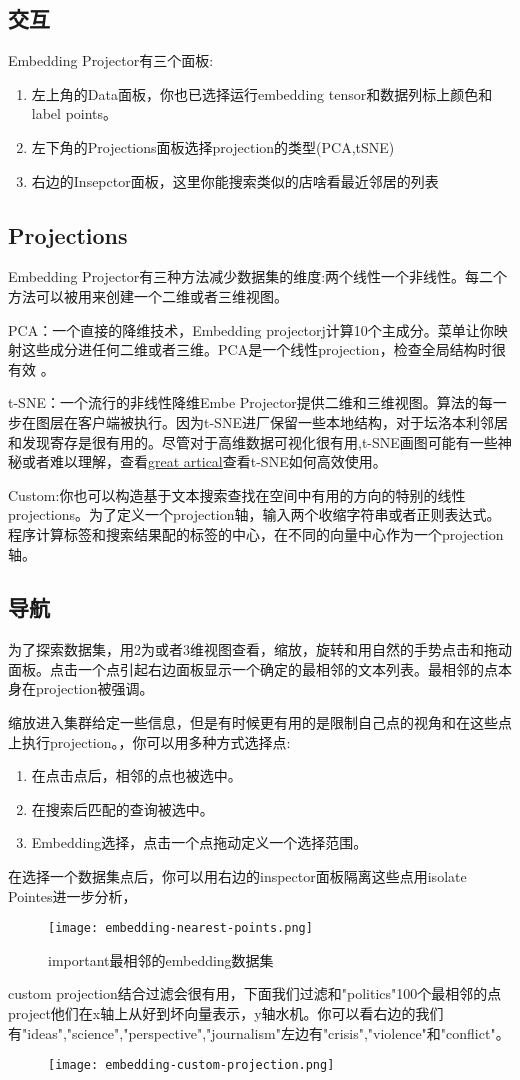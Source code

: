 \subsection{交互}
Embedding Projector有三个面板:
\begin{enumerate}
	\item 左上角的Data面板，你也已选择运行embedding tensor和数据列标上颜色和label points。
	\item 左下角的Projections面板选择projection的类型(PCA,tSNE)
	\item 右边的Insepctor面板，这里你能搜索类似的店啥看最近邻居的列表
\end{enumerate}
\subsection{Projections}
Embedding Projector有三种方法减少数据集的维度:两个线性一个非线性。每二个方法可以被用来创建一个二维或者三维视图。

PCA：一个直接的降维技术，Embedding projectorj计算10个主成分。菜单让你映射这些成分进任何二维或者三维。PCA是一个线性projection，检查全局结构时很有效
。

t-SNE：一个流行的非线性降维Embe Projector提供二维和三维视图。算法的每一步在图层在客户端被执行。因为t-SNE进厂保留一些本地结构，对于坛洛本利邻居和发现寄存是很有用的。尽管对于高维数据可视化很有用,t-SNE画图可能有一些神秘或者难以理解，查看\href{http://distill.pub/2016/misread-tsne/}{great artical}查看t-SNE如何高效使用。

Custom:你也可以构造基于文本搜索查找在空间中有用的方向的特别的线性projections。为了定义一个projection轴，输入两个收缩字符串或者正则表达式。程序计算标签和搜索结果配的标签的中心，在不同的向量中心作为一个projection轴。
\subsection{导航}
为了探索数据集，用2为或者3维视图查看，缩放，旋转和用自然的手势点击和拖动面板。点击一个点引起右边面板显示一个确定的最相邻的文本列表。最相邻的点本身在projection被强调。

缩放进入集群给定一些信息，但是有时候更有用的是限制自己点的视角和在这些点上执行projection。，你可以用多种方式选择点:
\begin{enumerate}
	\item 在点击点后，相邻的点也被选中。
	\item 在搜索后匹配的查询被选中。
	\item Embedding选择，点击一个点拖动定义一个选择范围。
\end{enumerate}
在选择一个数据集点后，你可以用右边的inspector面板隔离这些点用isolate Pointes进一步分析，
\begin{figure}[H]
	\texttt{[image: embedding-nearest-points.png]}
	\caption{important最相邻的embedding数据集}
\end{figure}
custom projection结合过滤会很有用，下面我们过滤和"politics"100个最相邻的点project他们在x轴上从好到坏向量表示，y轴水机。你可以看右边的我们有"ideas","science","perspective","journalism"左边有"crisis","violence"和"conflict"。
\begin{figure}
\texttt{[image: embedding-custom-projection.png]}
\end{figure}

